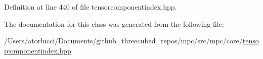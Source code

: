 Definition at line 440 of file tensorcomponentindex.\+hpp.



The documentation for this class was generated from the following file\+:\begin{DoxyCompactItemize}
\item 
/\+Users/atorlucci/\+Documents/github\+\_\+threecubed\+\_\+repos/mpc/src/mpc/core/\mbox{\hyperlink{tensorcomponentindex_8hpp}{tensorcomponentindex.\+hpp}}\end{DoxyCompactItemize}
